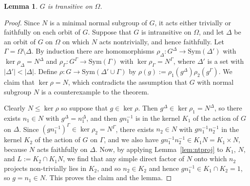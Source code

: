 \documentclass[12pt,a4paper]{article}
\newcommand{\Sym}{\mathrm{Sym}}
\newtheorem{lemma}[theorem]{Lemma} %
\begin{document}
\begin{lemma} $G$ is transitive on $\Omega$.
\end{lemma}
\begin{proof}
Since $N$ is a minimal normal subgroup of $G$, it acts either
trivially or faithfully on each orbit of $G$.
Suppose that $G$ is intransitive on $\Omega$, and let $\Delta$ be an
orbit of $G$ on $\Omega$ on which $N$ acts nontrivially, and hence faithfully.
Let $\Gamma = \Omega \setminus \Delta$.  By induction there are homomorphisms
$\rho_\Delta: G^\Delta \to \Sym(\Delta')$ with $\ker \rho_\Delta = N^\Delta$ and
$\rho_\Gamma: G^\Gamma \to \Sym(\Gamma)$ with $\ker \rho_\Gamma = N^\Gamma$,
where $\Delta'$ is a set with $|\Delta'|<|\Delta|$.
Define $\rho:G \to \Sym(\Delta' \cup \Gamma)$ by
$\rho(g) := \rho_1(g^\Delta)\rho_2(g^\Gamma)$.
We claim that $\ker \rho = N$, which contradicts the assumption that $G$ with
normal subgroup $N$ is a counterexample to the theorem.

Clearly $N \le \ker \rho$ so suppose that $g \in \ker \rho$.
Then $g^{\Delta} \in \ker \rho_1 = N^\Delta$, so there exists
$n_1 \in N$ with $g^\Delta = n_1^\Delta$, and then $gn_1^{-1}$
is in the kernel $K_1$ of the action of $G$ on $\Delta$.
Since $(gn_1^{-1})^\Gamma \in \ker \rho_2 = N^\Gamma$, there exists
$n_2 \in N$ with $gn_1^{-1}n_2^{-1}$ in the kernel $K_2$ of the action of
$G$ on $\Gamma$, and we also have
$gn_1^{-1}n_2^{-1} \in K_1 N = K_1 \times N$, because $N$ acts
faithfully on $\Delta$.
Now, by applying Lemma~\ref{lem:ntproj} to $K_1$, $N$, and
$L:=K_2 \cap K_1 N$, we find that any simple direct factor of $N$
onto which $n_2$ projects non-trivially lies in $K_2$, and so
$n_2 \in K_2$ and hence $gn_1^{-1} \in K_1 \cap K_2=1$,
so $g=n_1 \in N$.  This proves the claim and the lemma.
\end{proof}
 
\end{document}
